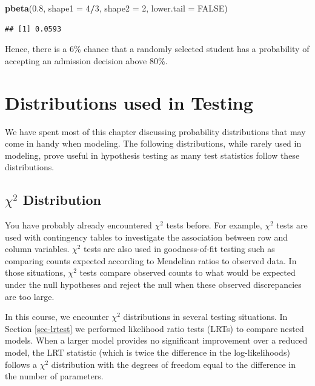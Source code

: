 \documentclass[
]{krantz}
\newenvironment{Shaded}{\begin{snugshade}}{\end{snugshade}}
\newcommand{\DataTypeTok}[1]{\textcolor[rgb]{0.27,0.27,0.27}{#1}}
\newcommand{\DecValTok}[1]{\textcolor[rgb]{0.06,0.06,0.06}{#1}}
\newcommand{\FloatTok}[1]{\textcolor[rgb]{0.06,0.06,0.06}{#1}}
\newcommand{\KeywordTok}[1]{\textcolor[rgb]{0.27,0.27,0.27}{\textbf{#1}}}
\newcommand{\NormalTok}[1]{#1}
\newcommand{\OperatorTok}[1]{\textcolor[rgb]{0.43,0.43,0.43}{\textbf{#1}}}
\newcommand{\OtherTok}[1]{\textcolor[rgb]{0.37,0.37,0.37}{#1}}
\begin{document}
\begin{Shaded}
\begin{Highlighting}[]
\KeywordTok{pbeta}\NormalTok{(}\FloatTok{0.8}\NormalTok{, }\DataTypeTok{shape1 =} \DecValTok{4}\OperatorTok{/}\DecValTok{3}\NormalTok{, }\DataTypeTok{shape2 =} \DecValTok{2}\NormalTok{, }\DataTypeTok{lower.tail =} \OtherTok{FALSE}\NormalTok{)}
\end{Highlighting}
\end{Shaded}

\begin{verbatim}
## [1] 0.0593
\end{verbatim}

Hence, there is a 6\% chance that a randomly selected student has a probability of accepting an admission decision above 80\%.

\hypertarget{distributions-used-in-testing}{%
\section{Distributions used in Testing}\label{distributions-used-in-testing}}

We have spent most of this chapter discussing probability distributions that may come in handy when modeling. The following distributions, while rarely used in modeling, prove useful in hypothesis testing as many test statistics follow these distributions.

\hypertarget{chi2-distribution}{%
\subsection{\texorpdfstring{\(\chi^2\) Distribution}{\textbackslash chi\^{}2 Distribution}}\label{chi2-distribution}}

You have probably already encountered \(\chi^2\) tests before. For example, \(\chi^2\) tests are used with contingency tables to investigate the association between row and column variables. \(\chi^2\) tests are also used in goodness-of-fit testing such as comparing counts expected according to Mendelian ratios to observed data. In those situations, \(\chi^2\) tests compare observed counts to what would be expected under the null hypotheses and reject the null when these observed discrepancies are too large.

In this course, we encounter \(\chi^2\) distributions in several testing situations. In Section \ref{sec-lrtest} we performed likelihood ratio tests (LRTs) to compare nested models. When a larger model provides no significant improvement over a reduced model, the LRT statistic (which is twice the difference in the log-likelihoods) follows a \(\chi^2\) distribution with the degrees of freedom equal to the difference in the number of parameters.
\end{document}
